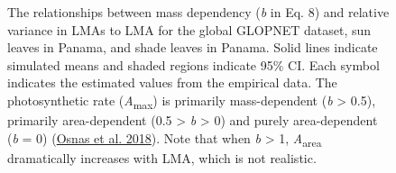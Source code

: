 \documentclass[
  12pt,
  a4paper,
,tablecaptionabove
]{scrartcl}
\begin{document}
\begin{figure}
{\caption{The relationships between mass dependency (\emph{b} in Eq. 8) and relative variance in LMAs to LMA for the global GLOPNET dataset, sun leaves in Panama, and shade leaves in Panama.
Solid lines indicate simulated means and shaded regions indicate 95\% CI.
Each symbol indicates the estimated values from the empirical data.
The photosynthetic rate (\emph{A}\textsubscript{max}) is primarily mass-dependent (\emph{b} \textgreater{} 0.5), primarily area-dependent (0.5 \textgreater{} \emph{b} \textgreater{} 0) and purely area-dependent (\emph{b} = 0) (\protect\hyperlink{ref-Osnas2018}{Osnas et al. 2018}).
Note that when \emph{b} \textgreater{} 1, \emph{A}\textsubscript{area} dramatically increases with LMA, which is not realistic.}\label{fig:massplt}
}
\end{figure}

\newpage
\end{document}
